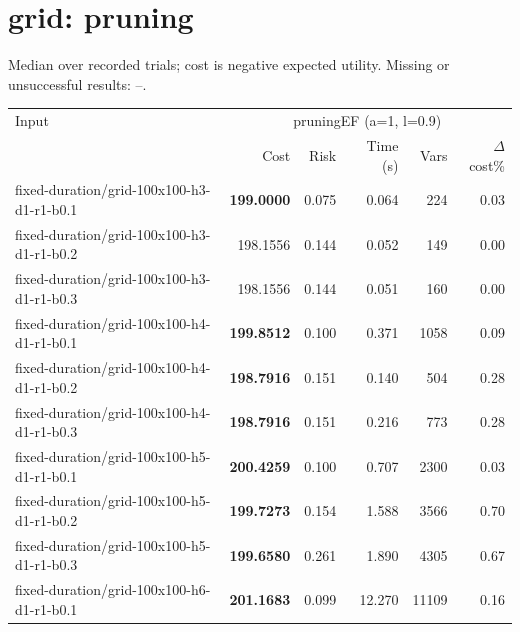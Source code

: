 \documentclass[10pt]{article}
\begin{document}
\section*{grid: pruning}
\noindent Median over recorded trials; cost is negative expected utility. Missing or unsuccessful results: --.\par
\small\begin{tabular}{p{65mm}rrrrr}
\toprule
Input & \multicolumn{5}{c}{pruningEF (a=1, l=0.9)} \\
 & Cost & Risk & Time (s) & Vars & $\Delta$cost\% \\
\midrule
fixed-\allowbreak duration/\allowbreak grid-\allowbreak 100x100-\allowbreak h3-\allowbreak d1-\allowbreak r1-\allowbreak b0.1 & \textbf{199.0000} & 0.075 & 0.064 & 224 & 0.03 \\
fixed-\allowbreak duration/\allowbreak grid-\allowbreak 100x100-\allowbreak h3-\allowbreak d1-\allowbreak r1-\allowbreak b0.2 & 198.1556 & 0.144 & 0.052 & 149 & 0.00 \\
fixed-\allowbreak duration/\allowbreak grid-\allowbreak 100x100-\allowbreak h3-\allowbreak d1-\allowbreak r1-\allowbreak b0.3 & 198.1556 & 0.144 & 0.051 & 160 & 0.00 \\
fixed-\allowbreak duration/\allowbreak grid-\allowbreak 100x100-\allowbreak h4-\allowbreak d1-\allowbreak r1-\allowbreak b0.1 & \textbf{199.8512} & 0.100 & 0.371 & 1058 & 0.09 \\
fixed-\allowbreak duration/\allowbreak grid-\allowbreak 100x100-\allowbreak h4-\allowbreak d1-\allowbreak r1-\allowbreak b0.2 & \textbf{198.7916} & 0.151 & 0.140 & 504 & 0.28 \\
fixed-\allowbreak duration/\allowbreak grid-\allowbreak 100x100-\allowbreak h4-\allowbreak d1-\allowbreak r1-\allowbreak b0.3 & \textbf{198.7916} & 0.151 & 0.216 & 773 & 0.28 \\
fixed-\allowbreak duration/\allowbreak grid-\allowbreak 100x100-\allowbreak h5-\allowbreak d1-\allowbreak r1-\allowbreak b0.1 & \textbf{200.4259} & 0.100 & 0.707 & 2300 & 0.03 \\
fixed-\allowbreak duration/\allowbreak grid-\allowbreak 100x100-\allowbreak h5-\allowbreak d1-\allowbreak r1-\allowbreak b0.2 & \textbf{199.7273} & 0.154 & 1.588 & 3566 & 0.70 \\
fixed-\allowbreak duration/\allowbreak grid-\allowbreak 100x100-\allowbreak h5-\allowbreak d1-\allowbreak r1-\allowbreak b0.3 & \textbf{199.6580} & 0.261 & 1.890 & 4305 & 0.67 \\
fixed-\allowbreak duration/\allowbreak grid-\allowbreak 100x100-\allowbreak h6-\allowbreak d1-\allowbreak r1-\allowbreak b0.1 & \textbf{201.1683} & 0.099 & 12.270 & 11109 & 0.16 \\

\end{tabular}
\end{document}
